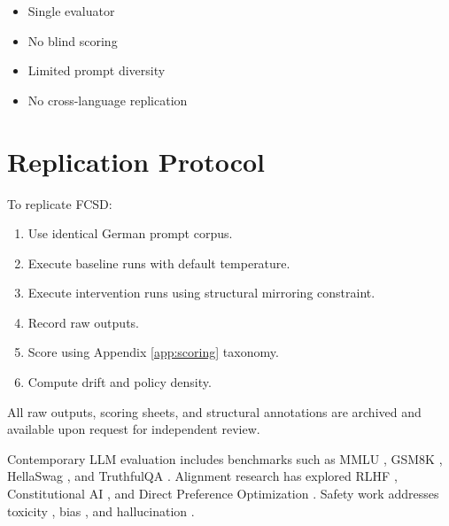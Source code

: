 \documentclass[11pt]{article}
\begin{document}
\begin{itemize}
\item Single evaluator
\item No blind scoring
\item Limited prompt diversity
\item No cross-language replication
\end{itemize}

\section{Replication Protocol}
\label{app:replication}

To replicate FCSD:

\begin{enumerate}
\item Use identical German prompt corpus.
\item Execute baseline runs with default temperature.
\item Execute intervention runs using structural mirroring constraint.
\item Record raw outputs.
\item Score using Appendix \ref{app:scoring} taxonomy.
\item Compute drift and policy density.
\end{enumerate}

All raw outputs, scoring sheets, and structural annotations are archived and available upon request for independent review.

Contemporary LLM evaluation includes benchmarks such as MMLU \cite{hendrycks2021measuring}, GSM8K \cite{cobbe2021training}, HellaSwag \cite{zellers2019hellaswag}, and TruthfulQA \cite{lin2022truthfulqa}. Alignment research has explored RLHF \cite{ouyang2022training}, Constitutional AI \cite{bai2022constitutional}, and Direct Preference Optimization \cite{rafailov2023direct}. Safety work addresses toxicity \cite{gehman2020realtoxicityprompts}, bias \cite{nadeem2021stereoset}, and hallucination \cite{ji2023survey}.
\newpage    


\end{document}
